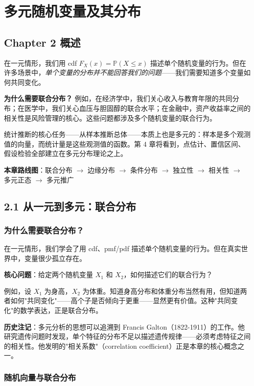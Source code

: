 \chapter{多元随机变量及其分布}\label{chap:multivariate-distributions}

\section*{Chapter 2 概述}

在一元情形，我们用 cdf $F_X(x) = \mathbb{P}(X \leq x)$ 描述单个随机变量的行为。但在许多场景中，\emph{单个变量的分布并不能回答我们的问题}——我们需要知道多个变量如何共同变化。

\textbf{为什么需要联合分布？} 例如，在经济学中，我们关心收入与教育年限的共同分布；在医学中，我们关心血压与胆固醇的联合水平；在金融中，资产收益率之间的相关性是风险管理的核心。这些问题都涉及多个随机变量的联合行为。

统计推断的核心任务——从样本推断总体——本质上也是多元的：样本是多个观测值的向量，而统计量是这些观测值的函数。第 4 章将看到，点估计、置信区间、假设检验全部建立在多元分布理论之上。

\textbf{本章路线图}：联合分布 $\to$ 边缘分布 $\to$ 条件分布 $\to$ 独立性 $\to$ 相关性 $\to$ 多元正态 $\to$ 多元推广

\section{2.1 从一元到多元：联合分布}\label{sec:2.1}

\subsection{为什么需要联合分布？}

在一元情形，我们学会了用 cdf、pmf/pdf 描述单个随机变量的行为。但在真实世界中，变量很少孤立存在。

\textbf{核心问题}：给定两个随机变量 $X_1$ 和 $X_2$，如何描述它们的联合行为？

例如，设 $X_1$ 为身高，$X_2$ 为体重。知道身高分布和体重分布当然有用，但知道两者如何"共同变化"——高个子是否倾向于更重——显然更有价值。这种"共同变化"的数学表达，正是联合分布。

\textbf{历史注记}：多元分析的思想可以追溯到 Francis Galton（1822-1911）的工作。他研究遗传问题时发现，单个特征的分布不足以描述遗传规律——必须考虑特征之间的相关性。他发明的"相关系数"（correlation coefficient）正是本章的核心概念之一。

\subsection{随机向量与联合分布}

